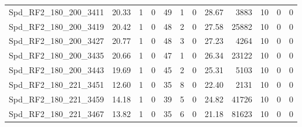 \begin{longtable}[c]{@{}lrrrrrrrrrrr@{}}
Spd\_RF2\_180\_200\_3411     & 20.33                  & 1                       & 0                       & 49                     & 1                       & 0                       & 28.67                   & 3883                     & 10                       & 0                        & 0                        \\
Spd\_RF2\_180\_200\_3419     & 20.42                  & 1                       & 0                       & 48                     & 2                       & 0                       & 27.58                   & 25882                    & 10                       & 0                        & 0                        \\
Spd\_RF2\_180\_200\_3427     & 20.77                  & 1                       & 0                       & 48                     & 3                       & 0                       & 27.23                   & 4264                     & 10                       & 0                        & 0                        \\
Spd\_RF2\_180\_200\_3435     & 20.66                  & 1                       & 0                       & 47                     & 1                       & 0                       & 26.34                   & 23122                    & 10                       & 0                        & 0                        \\
Spd\_RF2\_180\_200\_3443     & 19.69                  & 1                       & 0                       & 45                     & 2                       & 0                       & 25.31                   & 5103                     & 10                       & 0                        & 0                        \\
Spd\_RF2\_180\_221\_3451     & 12.60                  & 1                       & 0                       & 35                     & 8                       & 0                       & 22.40                   & 2131                     & 10                       & 0                        & 0                        \\
Spd\_RF2\_180\_221\_3459     & 14.18                  & 1                       & 0                       & 39                     & 5                       & 0                       & 24.82                   & 41726                    & 10                       & 0                        & 0                        \\
Spd\_RF2\_180\_221\_3467     & 13.82                  & 1                       & 0                       & 35                     & 6                       & 0                       & 21.18                   & 81623                    & 10                       & 0                        & 0                        \\

\end{longtable}
